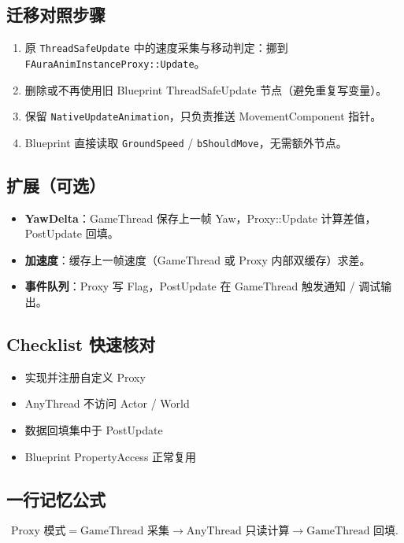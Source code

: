 \documentclass[10pt,openright,oneside,CJKmath]{MyBook}
\begin{document}
\subsection{迁移对照步骤}
\begin{enumerate}
  \item 原 \texttt{ThreadSafeUpdate} 中的速度采集与移动判定：挪到 \texttt{FAuraAnimInstanceProxy::Update}。
  \item 删除或不再使用旧 Blueprint ThreadSafeUpdate 节点（避免重复写变量）。
  \item 保留 \texttt{NativeUpdateAnimation}，只负责推送 MovementComponent 指针。
  \item Blueprint 直接读取 \texttt{GroundSpeed} / \texttt{bShouldMove}，无需额外节点。
\end{enumerate}

\subsection{扩展（可选）}
\begin{itemize}
  \item \textbf{YawDelta}：GameThread 保存上一帧 Yaw，Proxy::Update 计算差值，PostUpdate 回填。
  \item \textbf{加速度}：缓存上一帧速度（GameThread 或 Proxy 内部双缓存）求差。
  \item \textbf{事件队列}：Proxy 写 Flag，PostUpdate 在 GameThread 触发通知 / 调试输出。
\end{itemize}

\subsection{Checklist 快速核对}
\begin{itemize}
  \item[\checkmark] 实现并注册自定义 Proxy
  \item[\checkmark] AnyThread 不访问 Actor / World
  \item[\checkmark] 数据回填集中于 PostUpdate
  \item[\checkmark] Blueprint PropertyAccess 正常复用
\end{itemize}

\subsection{一行记忆公式}
\[
\text{Proxy 模式} = \text{GameThread 采集} \rightarrow \text{AnyThread 只读计算} \rightarrow \text{GameThread 回填}.
\]
\end{document}
